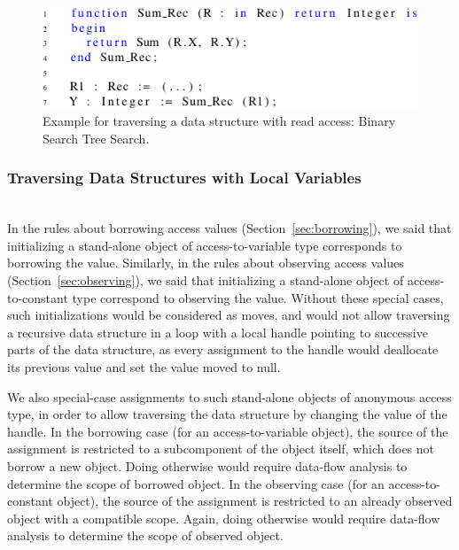 \documentclass{llncs}
\begin{document}
\begin{figure}[htb!]
\centering
  \captionsetup{justification=centering,margin=0.6cm}
   \includegraphics[]{observingComposite}
   \caption{Example for traversing a data structure with read access: Binary Search Tree Search.}
   \label{fig:observingComposite}
\end{figure}



\subsubsection{Traversing Data Structures with Local Variables}
\ \\

In the rules about borrowing access values (Section~\ref{sec:borrowing}), we said that initializing a stand-alone object of access-to-variable type corresponds to
borrowing the value. Similarly, in the rules about observing access values (Section~\ref{sec:observing}), we said that initializing a stand-alone object of
access-to-constant type correspond to observing the value. Without these special cases, such initializations would be considered as moves, and would not allow
traversing a recursive data structure in a loop with a local handle pointing to successive parts of the data structure, as every assignment to the handle would
deallocate its previous value and set the value moved to null.

\smallskip
We also special-case assignments to such stand-alone objects of anonymous access type, in order to allow traversing the data structure by changing the value of the handle.
In the borrowing case (for an access-to-variable object), the source of the assignment is restricted to a subcomponent of the object itself, which does not borrow a new object.
Doing otherwise would require data-flow analysis to determine the scope of borrowed object. In the observing case (for an access-to-constant object), the source of
the assignment is restricted to an already observed object with a compatible scope. Again, doing otherwise would require data-flow analysis to determine the scope of observed object.
\end{document}
